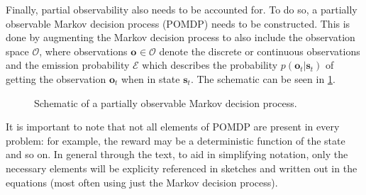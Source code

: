 Finally, partial observability also needs to be accounted for.
To do so, a partially observable Markov decision process (POMDP) needs to be constructed.
This is done by augmenting the Markov decision process to also include
the observation space $ \mathcal{O}  $, where observations $ \bm{o}_{} \in \mathcal{O} $
denote the discrete or continuous observations
and the emission probability $ \mathcal{E}  $ which describes the probability 
$ p(\bm{o}_{t} | \bm{s}_{t})  $ of getting the observation $ \bm{o}_{t}  $ when in state  $\bm{s}_{t}$.
The schematic can be seen in \ref{fig:pomdp}.

\begin{figure}[htpb]
\begin{center}
\end{center}
\caption{Schematic of a partially observable Markov decision process.}
\label{fig:pomdp}
\end{figure}
It is important to note that not all elements of POMDP are present in every problem: for example,
the reward may be a deterministic function of the state and so on.
In general through the text, to aid in simplifying notation, only the necessary elements will be explicity referenced
in sketches and written out in the equations (most often using just the Markov decision process).



